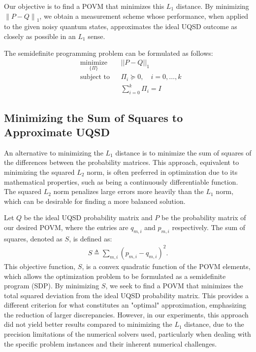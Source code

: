 Our objective is to find a POVM that minimizes this $L_1$ distance.
By minimizing $\left\| P-Q \right\|_{1}$, we obtain a measurement scheme whose
performance, when applied to the given noisy quantum states, approximates the
ideal UQSD outcome as closely as possible in an $L_1$ sense.

The semidefinite programming problem can be formulated as follows:
\begin{align}
     & \underset{\{\Pi\}}{\text{minimize}} &  & ||P-Q||_{1}                               \\
     & \text{subject to}                   &  & \Pi_{i} \succeq 0, \quad i = 0, \ldots, k \\
     &                                     &  & \sum_{i=0}^{k} \Pi_i = I
\end{align}

\subsection{Minimizing the Sum of Squares to Approximate UQSD}
An alternative to minimizing the $L_1$ distance is to minimize the sum of
squares of the differences between the probability matrices.
This approach, equivalent to minimizing the squared $L_2$ norm, is often
preferred in optimization due to its mathematical properties, such as being a
continuously differentiable function.
The squared $L_2$ norm penalizes large errors more heavily than the $L_1$ norm,
which can be desirable for finding a more balanced solution.

Let $Q$ be the ideal UQSD probability matrix and $P$ be the probability matrix
of our desired POVM, where the entries are $q_{m,i}$ and $p_{m,i}$ respectively. The sum of squares, denoted as $S$, is defined as:
\begin{align}
    S \triangleq \sum_{m,i} \left(p_{m,i} - q_{m,i}\right)^2.
\end{align}
This objective function, $S$, is a convex quadratic function of the POVM elements,
which allows the optimization problem to be formulated as a semidefinite program (SDP).
By minimizing $S$, we seek to find a POVM that minimizes the total squared
deviation from the ideal UQSD probability matrix.
This provides a different criterion for what constitutes an "optimal"
approximation, emphasizing the reduction of larger discrepancies.
However, in our experiments, this approach did not yield better results
compared to minimizing the $L_1$ distance, due to the precision limitations of
the numerical solvers used, particularly when dealing with the specific problem
instances and their inherent numerical challenges.

